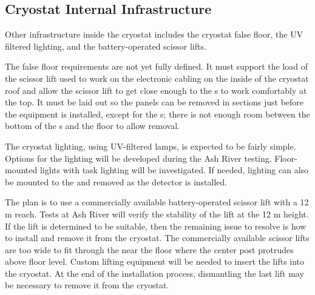 \subsection{Cryostat Internal Infrastructure}
\label{sec:fdsp-tc-infr-cryo-int}



Other infrastructure inside the cryostat includes the cryostat false floor, the UV filtered lighting, and the battery-operated scissor lifts. 

The false floor %
requirements are not yet fully defined. %
It must support the load of the scissor lift used to work on the electronic cabling on the inside of the cryostat roof and allow the scissor lift to get close enough to the s to work comfortably at the top. 
It  must be laid out so the panels can be removed in sections just before the equipment is installed,  %
except for the s;  there is not enough room between the bottom of the s %
and the floor to allow removal. %

The cryostat lighting, using UV-filtered  lamps, is expected to be fairly simple. Options for the lighting will be developed during the Ash River testing. Floor-mounted lights with task lighting will be investigated. If needed, lighting can also be mounted to the  and removed as the detector is installed.

The plan is to use a commercially available battery-operated scissor lift with a 12 \si{m} reach. Tests at Ash River will verify the stability of the lift at the 12 \si{m} height. If the lift is determined to be suitable, then the remaining issue to resolve is how to install and remove it from the cryostat. The commercially available scissor lifts are too wide to fit through the  near the floor where the center post protrudes above floor level. Custom lifting equipment will be needed to insert the lifts into the cryostat. At the end of the installation process, dismantling the last lift may be necessary to remove it from the cryostat.

\clearpage

